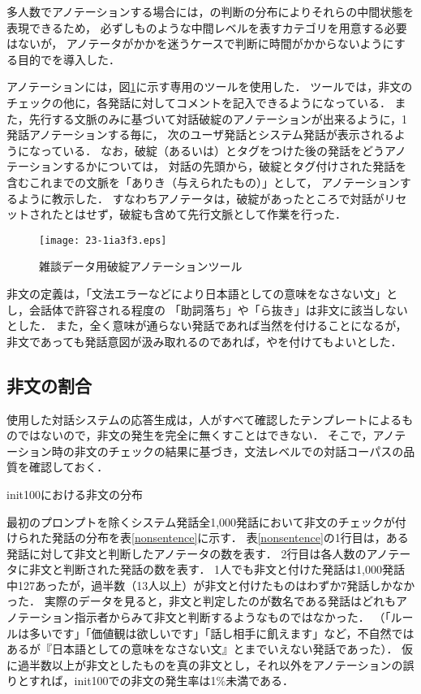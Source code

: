 \documentclass[japanese]{jnlp_1.4}
\newcommand{\maru}{}
\newcommand{\batsu}{}
\newcommand{\sankaku}{}
\begin{document}
多人数でアノテーションする場合には，\maru \batsu の判断の分布によりそれらの中間状態を表現できるため，
必ずしも\sankaku のような中間レベルを表すカテゴリを用意する必要はないが，
アノテータが\maru か\batsu かを迷うケースで判断に時間がかからないようにする目的で\sankaku を導入した．

アノテーションには，図\ref{tool}に示す専用のツールを使用した．
ツールでは，非文のチェックの他に，各発話に対してコメントを記入できるようになっている．
また，先行する文脈のみに基づいて対話破綻のアノテーションが出来るように，1発話アノテーションする毎に，
次のユーザ発話とシステム発話が表示されるようになっている．
なお，破綻（\sankaku あるいは\batsu ）とタグをつけた後の発話をどうアノテーションするかについては，
対話の先頭から，破綻とタグ付けされた発話を含むこれまでの文脈を「ありき（与えられたもの）」として，
アノテーションするように教示した．
すなわちアノテータは，破綻があったところで対話がリセットされたとはせず，破綻も含めて先行文脈として作業を行った．

\begin{figure}[b]
\begin{center}
\texttt{[image: 23-1ia3f3.eps]}
\end{center}
\caption{雑談データ用破綻アノテーションツール}\label{tool}
\end{figure}

非文の定義は，「文法エラーなどにより日本語としての意味をなさない文」とし，会話体で許容される程度の
「助詞落ち」や「ら抜き」は非文に該当しないとした．
また，全く意味が通らない発話であれば当然\batsu を付けることになるが，
非文であっても発話意図が汲み取れるのであれば，\maru や\sankaku を付けてもよいとした．


\subsection{非文の割合}

使用した対話システム\cite{oonishi}の応答生成は，人がすべて確認したテンプレートによるものではないので，非文の発生を完全に無くすことはできない．
そこで，アノテーション時の非文のチェックの結果に基づき，文法レベルでの対話コーパスの品質を確認しておく．

\begin{table}[b]
\caption{init100における非文の分布}
\label{nonsentence}

\end{table}

最初のプロンプトを除くシステム発話全1,000発話において非文のチェックが付けられた発話の分布を表\ref{nonsentence}に示す．
表\ref{nonsentence}の1行目は，ある発話に対して非文と判断したアノテータの数を表す．
2行目は各人数のアノテータに非文と判断された発話の数を表す．
1人でも非文と付けた発話は1,000発話中127あったが，過半数（13人以上）が非文と付けたものはわずか7発話しかなかった．
実際のデータを見ると，非文と判定したのが数名である発話はどれもアノテーション指示者からみて非文と判断するようなものではなかった．
（「ルールは多いです」「価値観は欲しいです」「話し相手に飢えます」など，不自然ではあるが『日本語としての意味をなさない文』とまでいえない発話であった）．
仮に過半数以上が非文としたものを真の非文とし，それ以外をアノテーションの誤りとすれば，init100での非文の発生率は1\%未満である．
\end{document}
